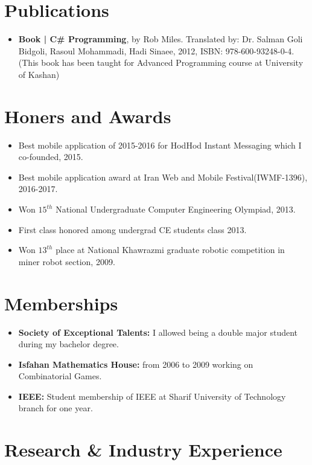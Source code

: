 \documentclass[10pt,a4paper,roman]{moderncv}        %
\begin{document}
\section{Publications}
\begin{itemize}

\item{
\textbf{Book | C\# Programming}, by Rob Miles. Translated by: Dr. Salman Goli Bidgoli, Rasoul Mohammadi, Hadi Sinaee, 2012, ISBN: 978-600-93248-0-4. (This book has been taught for Advanced Programming course at University of Kashan)
}

\end{itemize}

\section{Honers and Awards}
\begin{itemize}
\item Best mobile application of 2015-2016 for HodHod Instant Messaging which I co-founded, 2015.
\item Best mobile application award at Iran Web and Mobile Festival(IWMF-1396), 2016-2017.
\item Won $15^{th}$ National Undergraduate Computer Engineering Olympiad, 2013.
\item First class honored among undergrad CE students class 2013.
\item Won $13^{th}$ place at National Khawrazmi graduate robotic competition in miner robot section, 2009.
\end{itemize}
\section{Memberships}
\begin{itemize}

\item \textbf{Society of Exceptional Talents:} I allowed being a double major student during my bachelor degree.


\item \textbf{Isfahan Mathematics House:} from 2006 to 2009 working on Combinatorial Games.


\item \textbf{IEEE: }Student membership of IEEE at Sharif University of Technology branch for one year.

\end{itemize}

\section{Research \& Industry Experience}
\end{document}
